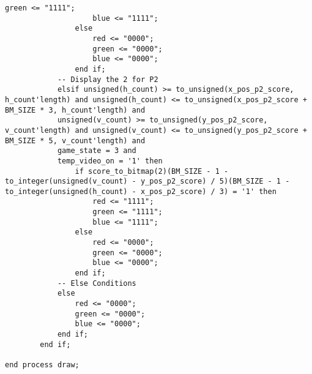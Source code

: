 \documentclass{article}
\begin{document}
\begin{lstlisting}[caption=Draw Process, label=lst:draw-process]
                    green <= "1111";
                    blue <= "1111";
                else
                    red <= "0000";
                    green <= "0000";
                    blue <= "0000";
                end if;
            -- Display the 2 for P2
            elsif unsigned(h_count) >= to_unsigned(x_pos_p2_score, h_count'length) and unsigned(h_count) <= to_unsigned(x_pos_p2_score + BM_SIZE * 3, h_count'length) and
            unsigned(v_count) >= to_unsigned(y_pos_p2_score, v_count'length) and unsigned(v_count) <= to_unsigned(y_pos_p2_score + BM_SIZE * 5, v_count'length) and
            game_state = 3 and
            temp_video_on = '1' then
                if score_to_bitmap(2)(BM_SIZE - 1 - to_integer(unsigned(v_count) - y_pos_p2_score) / 5)(BM_SIZE - 1 - to_integer(unsigned(h_count) - x_pos_p2_score) / 3) = '1' then
                    red <= "1111";
                    green <= "1111";
                    blue <= "1111";
                else
                    red <= "0000";
                    green <= "0000";
                    blue <= "0000";
                end if;
            -- Else Conditions
            else
                red <= "0000";
                green <= "0000";
                blue <= "0000";
            end if;
        end if;

end process draw;
\end{lstlisting}
\end{document}
